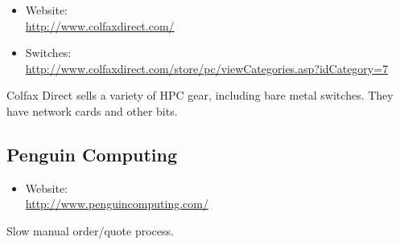 \begin{itemize}
 \item Website: \\ \url{http://www.colfaxdirect.com/}
 \item Switches: \\ \url{http://www.colfaxdirect.com/store/pc/viewCategories.asp?idCategory=7}
\end{itemize}


Colfax Direct sells a variety of HPC gear, including bare metal switches.
They have network cards and other bits.


\subsection{Penguin Computing}
\begin{itemize}
 \item Website: \\ \url{http://www.penguincomputing.com/}
\end{itemize}


Slow manual order/quote process.

